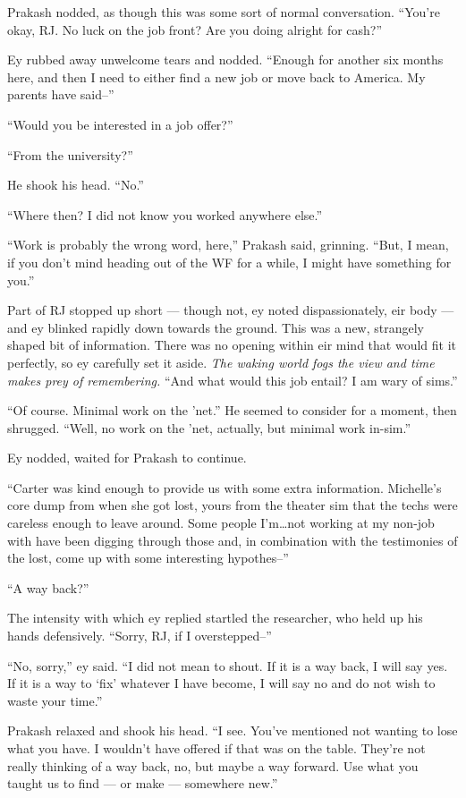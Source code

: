Prakash nodded, as though this was some sort of normal conversation. ``You're okay, RJ. No luck on the job front? Are you doing alright for cash?''

Ey rubbed away unwelcome tears and nodded. ``Enough for another six months here, and then I need to either find a new job or move back to America. My parents have said--''

``Would you be interested in a job offer?''

``From the university?''

He shook his head. ``No.''

``Where then? I did not know you worked anywhere else.''

``Work is probably the wrong word, here,'' Prakash said, grinning. ``But, I mean, if you don't mind heading out of the WF for a while, I might have something for you.''

Part of RJ stopped up short — though not, ey noted dispassionately, eir body — and ey blinked rapidly down towards the ground. This was a new, strangely shaped bit of information. There was no opening within eir mind that would fit it perfectly, so ey carefully set it aside. \emph{The waking world fogs the view and time makes prey of remembering.} ``And what would this job entail? I am wary of sims.''

``Of course. Minimal work on the 'net.'' He seemed to consider for a moment, then shrugged. ``Well, no work on the 'net, actually, but minimal work in-sim.''

Ey nodded, waited for Prakash to continue.

``Carter was kind enough to provide us with some extra information. Michelle's core dump from when she got lost, yours from the theater sim that the techs were careless enough to leave around. Some people I'm\ldots not working at my non-job with have been digging through those and, in combination with the testimonies of the lost, come up with some interesting hypothes--''

``A way back?''

The intensity with which ey replied startled the researcher, who held up his hands defensively. ``Sorry, RJ, if I overstepped--''

``No, sorry,'' ey said. ``I did not mean to shout. If it is a way back, I will say yes. If it is a way to `fix' whatever I have become, I will say no and do not wish to waste your time.''

Prakash relaxed and shook his head. ``I see. You've mentioned not wanting to lose what you have. I wouldn't have offered if that was on the table. They're not really thinking of a way back, no, but maybe a way forward. Use what you taught us to find — or make — somewhere new.''

